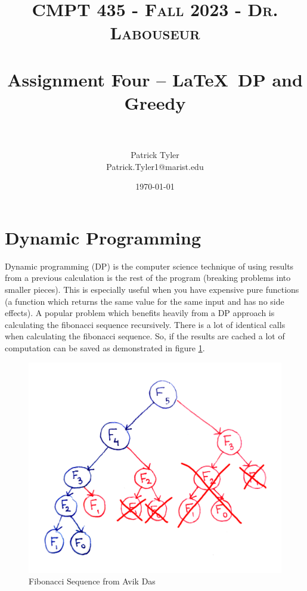 \documentclass[letterpaper, 10pt]{article}
\title{	
   \normalfont \normalsize 
   \textsc{CMPT 435 - Fall 2023 - Dr. Labouseur} \\[10pt] %
   \horrule{0.5pt} \\[0.25cm] 	%
   \huge Assignment Four -- \LaTeX ~DP and Greedy\\     	    %
   \horrule{0.5pt} \\[0.25cm] 	%
}
\author{Patrick Tyler \\ \normalsize Patrick.Tyler1@marist.edu}
\date{\normalsize\today} 	%
\begin{document}
\maketitle %
\section{Dynamic Programming}
Dynamic programming (DP) is the computer science technique of using results from a previous calculation
is the rest of the program (breaking problems into smaller pieces). This is especially useful when you have expensive pure functions 
(a function which returns the same value for the same input and has no side effects).
A popular problem which benefits heavily from a DP approach is calculating
the fibonacci sequence recursively. There is a lot of identical calls when calculating the fibonacci sequence.
So, if the results are cached a lot of computation can be saved as demonstrated in figure \ref{fig:fib}.
\begin{figure}[h]
    \centering
    \includegraphics[width=.55\textwidth]{fibonacci-memoized.png}
    \caption{Fibonacci Sequence from Avik Das}
    \label{fig:fib}
\end{figure}
\newpage
\end{document}
